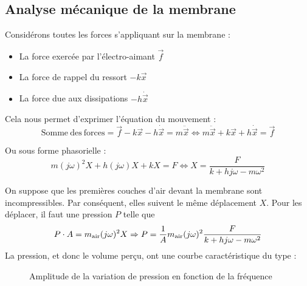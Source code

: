 \subsection{Analyse mécanique de la membrane}
Considérons toutes les forces s'appliquant sur la membrane :
\begin{itemize}
\item La force exercée par l'électro-aimant $ \vec{f} $ 
\item La force de rappel du ressort $ - k \vec{x} $
\item La force due aux dissipations $ - h \dot{\vec{x}} $
\end{itemize}

Cela nous permet d'exprimer l'équation du mouvement :
\begin{equation}
\mathrm{Somme\ des\ forces} = \vec{f} - k \vec{x} - h \dot{\vec{x}} = m \ddot{\vec{x}}
\Leftrightarrow m \ddot{\vec{x}} + k \vec{x} + h \dot{\vec{x}} = \vec{f}
\end{equation}

Ou sous forme phasorielle :
\begin{equation}
m (j\omega)^2 X+ h (j\omega)X + kX = F
\Leftrightarrow X = \frac{F}{k + hj\omega - m {\omega}^2}
\end{equation}

On suppose que les premières couches d’air devant la membrane sont incompressibles. Par conséquent, elles suivent le même déplacement $X$.
Pour les déplacer, il faut une pression $P$ telle que 
\begin{equation}
P\cdot A = m_{\mathrm{air}} (j \omega)^2X
\Rightarrow P = \frac{1}{A}m_{\mathrm{air}} (j \omega)^2 \frac{F}{k+hj \omega -m \omega^2}
\end{equation}
La pression, et donc le volume perçu, ont une courbe caractéristique du type :

\begin{figure}[h!]
    \centering
    \caption{Amplitude de la variation de pression en fonction de la fréquence}
\end{figure}

